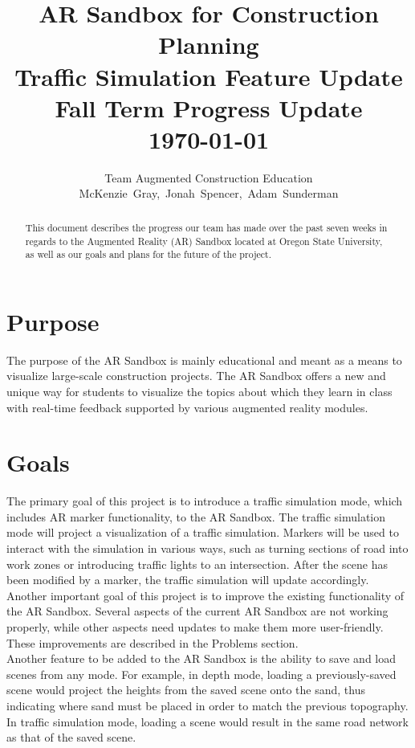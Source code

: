 \documentclass[letterpaper, 10pt, onecolumn, draftclsnofoot]{IEEEtran}
\title{\Large{\textbf{AR Sandbox for Construction Planning \\
                      Traffic Simulation Feature Update \\ 
                      \large{Fall Term Progress Update}}} \\
                      \vspace{15pt}
                      \small{ \today}}
\author{Team Augmented Construction Education \\
       McKenzie~Gray,~Jonah~Spencer,~Adam~Sunderman}
\begin{document}
\maketitle
\vspace{100pt}

\begin{abstract}
    This document describes the progress our team has made over the past seven weeks in regards to the Augmented Reality (AR) Sandbox located at Oregon State University, as well as our goals and plans for the future of the project. 
\end{abstract}
\newpage
\tableofcontents
\clearpage
\newpage

\section{Purpose}
    The purpose of the AR Sandbox is mainly educational and meant as a means to visualize large-scale construction projects. The AR Sandbox offers a new and unique way for students to visualize the topics about which they learn in class with real-time feedback supported by various augmented reality modules.

\section{Goals}
    The primary goal of this project is to introduce a traffic simulation mode, which includes AR marker functionality, to the AR Sandbox. The traffic simulation mode will project a visualization of a traffic simulation. Markers will be used to interact with the simulation in various ways, such as turning sections of road into work zones or introducing traffic lights to an intersection. After the scene has been modified by a marker, the traffic simulation will update accordingly. \\
    
    Another important goal of this project is to improve the existing functionality of the AR Sandbox. Several aspects of the current AR Sandbox are not working properly, while other aspects need updates to make them more user-friendly. These improvements are described in the Problems section. \\
    
    Another feature to be added to the AR Sandbox is the ability to save and load scenes from any mode. For example, in depth mode, loading a previously-saved scene would project the heights from the saved scene onto the sand, thus indicating where sand must be placed in order to match the previous topography. In traffic simulation mode, loading a scene would result in the same road network as that of the saved scene.
    
\end{document}
